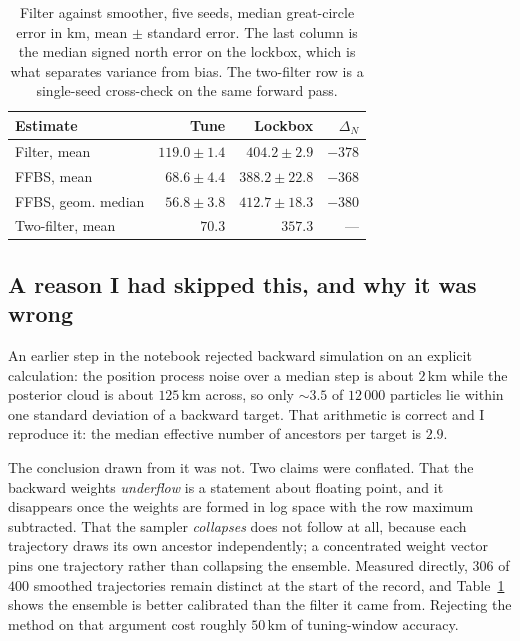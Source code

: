 \documentclass[conference]{IEEEtran}
\begin{document}
\begin{table}[t]
\caption{Filter against smoother, five seeds, median great-circle error in
\si{\km}, mean $\pm$ standard error. The last column is the median signed
north error on the lockbox, which is what separates variance from bias. The
two-filter row is a single-seed cross-check on the same forward pass.}
\label{tab:smooth}
\centering
\begin{tabular}{@{}lrrr@{}}
\toprule
Estimate & Tune & Lockbox & $\Delta_N$ \\
\midrule
Filter, mean       & $119.0\pm1.4$ & $404.2\pm2.9$  & $-378$ \\
FFBS, mean         & $68.6\pm4.4$  & $388.2\pm22.8$ & $-368$ \\
FFBS, geom. median & $56.8\pm3.8$  & $412.7\pm18.3$ & $-380$ \\
Two-filter, mean   & $70.3$        & $357.3$        & --- \\
\bottomrule
\end{tabular}
\end{table}

\subsection{A reason I had skipped this, and why it was wrong}

An earlier step in the notebook rejected backward simulation on an explicit
calculation: the position process noise over a median step is about
$2$\,\si{\km} while the posterior cloud is about $125$\,\si{\km} across, so only
$\sim3.5$ of $12\,000$ particles lie within one standard deviation of a backward
target. That arithmetic is correct and I reproduce it: the median effective
number of ancestors per target is $2.9$.

The conclusion drawn from it was not. Two claims were conflated. That the
backward weights \emph{underflow} is a statement about floating point, and it
disappears once the weights are formed in log space with the row maximum
subtracted. That the sampler \emph{collapses} does not follow at all, because
each trajectory draws its own ancestor independently; a concentrated weight
vector pins one trajectory rather than collapsing the ensemble. Measured
directly, $306$ of $400$ smoothed trajectories remain distinct at the start of
the record, and Table~\ref{tab:smooth} shows the ensemble is better calibrated
than the filter it came from. Rejecting the method on that argument cost roughly
$50$\,\si{\km} of tuning-window accuracy.
\end{document}
